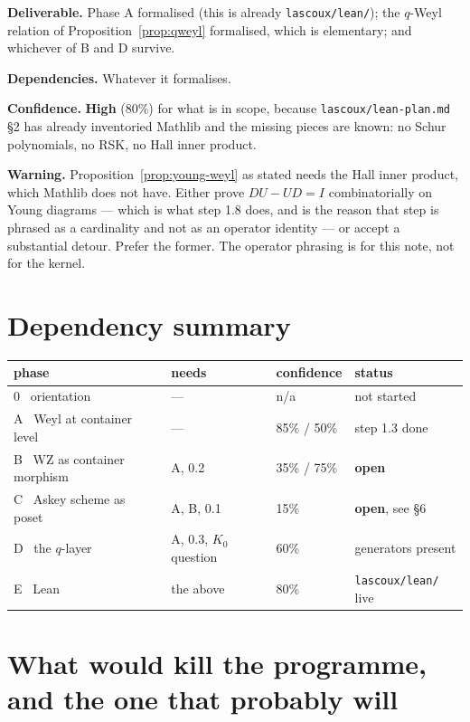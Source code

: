 \documentclass[11pt,a4paper]{article}
\theoremstyle{definition}
\theoremstyle{remark}
\newcommand{\MAYBE}{\textcolor{amber}{\textbf{open}}}
\begin{document}
\textbf{Deliverable.} Phase A formalised (this is already \texttt{lascoux/lean/}); the
$q$-Weyl relation of Proposition~\ref{prop:qweyl} formalised, which is elementary; and
whichever of B and D survive.

\textbf{Dependencies.} Whatever it formalises.

\textbf{Confidence.} \textbf{High} (80\%) for what is in scope, because
\texttt{lascoux/lean-plan.md} \S2 has already inventoried Mathlib and the missing
pieces are known: no Schur polynomials, no RSK, no Hall inner product.

\textbf{Warning.} Proposition~\ref{prop:young-weyl} as stated needs the Hall inner
product, which Mathlib does not have. Either prove $DU - UD = I$ combinatorially on
Young diagrams --- which is what step 1.8 does, and is the reason that step is phrased
as a cardinality and not as an operator identity --- or accept a substantial detour.
Prefer the former. The operator phrasing is for this note, not for the kernel.

\section{Dependency summary}

\begin{center}
\small
\renewcommand{\arraystretch}{1.25}
\begin{tabular}{@{}llll@{}}
\toprule
phase & needs & confidence & status \\
\midrule
0 \ orientation & --- & n/a & not started \\
A \ Weyl at container level & --- & 85\% / 50\% & step 1.3 done \\
B \ WZ as container morphism & A, 0.2 & 35\% / 75\% & \MAYBE \\
C \ Askey scheme as poset & A, B, 0.1 & 15\% & \MAYBE, see \S6 \\
D \ the $q$-layer & A, 0.3, $K_0$ question & 60\% & generators present \\
E \ Lean & the above & 80\% & \texttt{lascoux/lean/} live \\
\bottomrule
\end{tabular}
\end{center}

\section{What would kill the programme, and the one that probably will}
\end{document}
